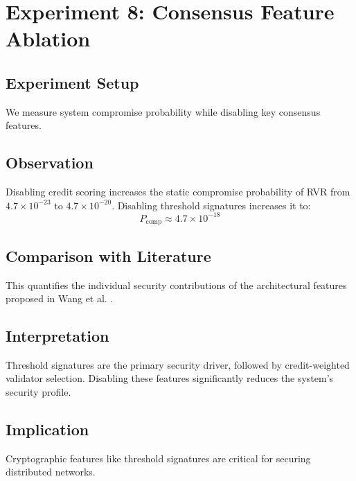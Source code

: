 \documentclass[12pt, oneside, a4paper]{report}
\theoremstyle{definition}
\theoremstyle{remark}
\begin{document}
\bigskip

\section{Experiment 8: Consensus Feature Ablation}
\label{sec:res:e8}

\subsection{Experiment Setup}
We measure system compromise probability while disabling key consensus features.

\subsection{Observation}
Disabling credit scoring increases the static compromise probability of RVR from $4.7 \times 10^{-23}$ to $4.7 \times 10^{-20}$. Disabling threshold signatures increases it to:
\begin{equation}
P_{\mathrm{comp}} \approx 4.7 \times 10^{-18}
\end{equation}

\subsection{Comparison with Literature}
This quantifies the individual security contributions of the architectural features proposed in Wang et al. \cite{wang2025}.

\subsection{Interpretation}
Threshold signatures are the primary security driver, followed by credit-weighted validator selection. Disabling these features significantly reduces the system's security profile.

\subsection{Implication}
Cryptographic features like threshold signatures are critical for securing distributed networks.
\end{document}
